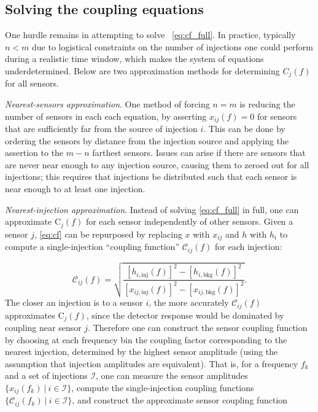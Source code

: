 \subsection{Solving the coupling equations}

One hurdle remains in attempting to solve ~\cref{eq:cf_full}.
In practice, typically $n<m$ due to logistical constraints on the number of injections one could perform during a realistic time window, which makes the system of equations underdetermined.
Below are two approximation methods for determining $C_j(f)$ for all sensors.

\textit{Nearest-sensors approximation}.
One method of forcing $n=m$ is reducing the number of sensors in each each equation, by asserting $x_{ij}(f)=0$ for sensors that are sufficiently far from the source of injection $i$.
This can be done by ordering the sensors by distance from the injection source and applying the assertion to the $m-n$ farthest sensors.
Issues can arise if there are sensors that are never near enough to any injection source, causing them to zeroed out for all injections; this requires that injections be distributed such that each sensor is near enough to at least one injection.

\textit{Nearest-injection approximation}.
Instead of solving \cref{eq:cf_full} in full, one can approximate $\mathrm{C}_j(f)$ for each sensor independently of other sensors.
Given a sensor $j$, \cref{eq:cf} can be repurposed by replacing $x$ with $x_{ij}$ and $h$ with $h_i$ to compute a single-injection ``coupling function'' $\mathcal{C}_{ij}(f)$ for each injection:

\begin{equation}\label{eq:sicf}
	\mathcal{C}_{ij}(f) = \sqrt{\frac{[h_{i,\textrm{inj}}(f)]^2 - [h_{i,\textrm{bkg}}(f)]^2}{[x_{ij,\textrm{inj}}(f)]^2 - [x_{ij,\textrm{bkg}}(f)]^2}}.
\end{equation}
The closer an injection is to a sensor $i$, the more accurately $\mathcal{C}_{ij}(f)$ approximates $\mathrm{C}_j(f)$, since the detector response would be dominated by coupling near sensor $j$.
Therefore one can construct the sensor coupling function by choosing at each frequency bin the coupling factor corresponding to the nearest injection, determined by the highest sensor amplitude (using the assumption that injection amplitudes are equivalent).
That is, for a frequency $f_k$ and a set of injections $\mathcal{I}$, one can measure the sensor amplitudes $\{x_{ij}(f_k)\ |\ i \in \mathcal{I}\}$, compute the single-injection coupling functions $\{\mathcal{C}_{ij}(f_k)\ |\ i \in \mathcal{I}\}$, and construct the approximate sensor coupling function

